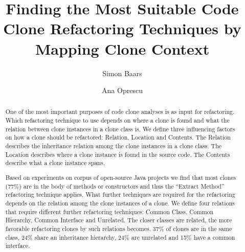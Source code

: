 \documentclass[runningheads]{llncs}
\begin{document}
%
\title{Finding the Most Suitable Code Clone Refactoring Techniques by Mapping Clone Context}
%
%
\author{Simon Baars \and
Ana Oprescu}
%
%
%
\maketitle              %
%
\begin{abstract}
One of the most important purposes of code clone analyses is as input for refactoring. Which refactoring technique to use depends on where a clone is found and what the relation between clone instances in a clone class is. We define three influencing factors on how a clone should be refactored: Relation, Location and Contents. The Relation describes the inheritance relation among the clone instances in a clone class. The Location describes where a clone instance is found in the source code. The Contents describe what a clone instance spans.

Based on experiments on corpus of open-source Java projects we find that most clones (77\%) are in the body of methods or constructors and thus the ``Extract Method'' refactoring technique applies. What further techniques are required for the refactoring depends on the relation among the clone instances of a clone. We define four relations that require different further refactoring techniques: Common Class, Common Hierarchy, Common Interface and Unrelated. %
The closer classes are related, the more favorable refactoring clones by such relations becomes. 37\% of clones are in the same class, 24\% share an inheritance hierarchy, 24\% are unrelated and 15\% have a common interface.%


\end{abstract}
%
%
%
\end{document}
